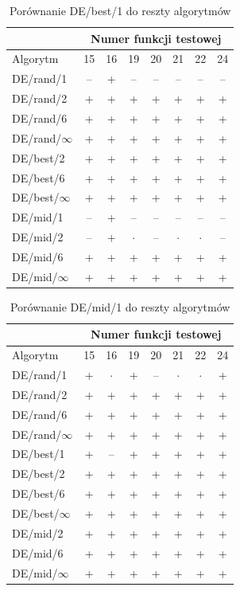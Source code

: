 \documentclass[a4paper,onecolumn,oneside,12pt,wide,floatssmall]{mwrep}
\theoremstyle{definition}
\theoremstyle{plain}%
\theoremstyle{remark}
\begin{document}
\begin{table}[H]
\centering
\begin{tabular}{ l | c | c | c | c | c | c | c }
		 & \multicolumn{7}{c}{Numer funkcji testowej}  \\  \hline
Algorytm         &15& 16& 19& 20& 21& 22& 24 \\ \hline
DE/rand/1	 & -- & + & -- & -- & -- & -- & -- \\
DE/rand/2	 & + & + & + & + & + & + & + \\
DE/rand/6	 & + & + & + & + & + & + & + \\
DE/rand/$\infty$	 & + & + & + & + & + & + & + \\
DE/best/2	 & + & + & + & + & + & + & + \\
DE/best/6	 & + & + & + & + & + & + & + \\
DE/best/$\infty$	 & + & + & + & + & + & + & + \\
DE/mid/1	 & -- & + & -- & -- & -- & -- & -- \\
DE/mid/2	 & -- & + & $\cdot$ & -- & $\cdot$ & $\cdot$ & -- \\
DE/mid/6	 & + & + & + & + & + & + & + \\
DE/mid/$\infty$	 & + & + & + & + & + & + & + \\
\end{tabular}
\caption{Porównanie DE/best/1 do reszty algorytmów}
\end{table}

\begin{table}[H]
\centering
\begin{tabular}{ l | c | c | c | c | c | c | c }
		 & \multicolumn{7}{c}{Numer funkcji testowej}  \\  \hline
Algorytm         &15& 16& 19& 20& 21& 22& 24 \\ \hline
DE/rand/1	 & + & $\cdot$ & + & -- & $\cdot$ & $\cdot$ & + \\
DE/rand/2	 & + & + & + & + & + & + & + \\
DE/rand/6	 & + & + & + & + & + & + & + \\
DE/rand/$\infty$	 & + & + & + & + & + & + & + \\
DE/best/1	 & + & -- & + & + & + & + & + \\
DE/best/2	 & + & + & + & + & + & + & + \\
DE/best/6	 & + & + & + & + & + & + & + \\
DE/best/$\infty$	 & + & + & + & + & + & + & + \\
DE/mid/2	 & + & + & + & + & + & + & + \\
DE/mid/6	 & + & + & + & + & + & + & + \\
DE/mid/$\infty$	 & + & + & + & + & + & + & + \\
\end{tabular}
\caption{Porównanie DE/mid/1 do reszty algorytmów}
\end{table}
\end{document}
